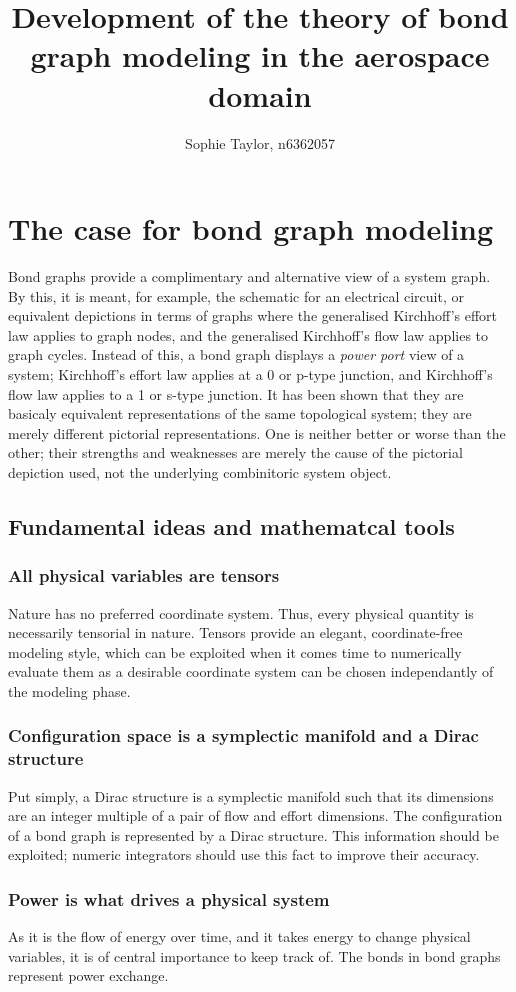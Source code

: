 \documentclass[utf,a4paper,12pt]{report}
\title{Development of the theory of bond graph modeling in the aerospace domain}
\author{Sophie Taylor, n6362057}
\begin{document}
\maketitle
\tableofcontents
\chapter{The case for bond graph modeling}
Bond graphs provide a complimentary and alternative view of a system graph. By this, it is meant, for example, the schematic for an electrical circuit, or equivalent depictions in terms of graphs where the generalised Kirchhoff's effort law applies to graph nodes, and the generalised Kirchhoff's flow law applies to graph cycles. Instead of this, a bond graph displays a \emph{power port} view of a system; Kirchhoff's effort law applies at a 0 or p-type junction, and Kirchhoff's flow law applies to a 1 or s-type junction. It has been shown that they are basicaly equivalent representations of the same topological system; they are merely different pictorial representations. One is neither better or worse than the other; their strengths and weaknesses are merely the cause of the pictorial depiction used, not the underlying combinitoric system object.
\section{Fundamental ideas and mathematcal tools}
\subsection{All physical variables are tensors}
Nature has no preferred coordinate system. Thus, every physical quantity is necessarily tensorial in nature. Tensors provide an elegant, coordinate-free modeling style, which can be exploited when it comes time to numerically evaluate them as a desirable coordinate system can be chosen independantly of the modeling phase.
\subsection{Configuration space is a symplectic manifold and a Dirac structure}
Put simply, a Dirac structure is a symplectic manifold such that its dimensions are an integer multiple of a pair of flow and effort dimensions. The configuration of a bond graph is represented by a Dirac structure. This information should be exploited; numeric integrators should use this fact to improve their accuracy. 
\subsection{Power is what drives a physical system}
As it is the flow of energy over time, and it takes energy to change physical variables, it is of central importance to keep track of. The bonds in bond graphs represent power exchange.
\end{document}
